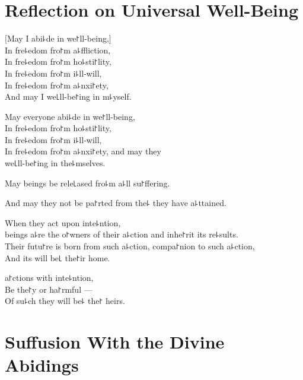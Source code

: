\chapter[Universal Well-Being]{Reflection on Universal Well-Being}


\begin{leader}
\end{leader}

[May I abi꜕de in we꜓ll-being,]\\
In fre꜕edom fro꜓m a꜕ffliction,\\
In fre꜕edom fro꜓m ho꜕sti꜓lity,\\
In fre꜕edom fro꜓m i꜕ll-will,\\
In fre꜕edom fro꜓m a꜕nxi꜓ety,\\
And may I  we꜖ll-be꜓ing in m꜕yself.

May everyone abi꜕de in we꜓ll-being,\\
In fre꜕edom fro꜓m ho꜕sti꜓lity,\\
In fre꜕edom fro꜓m i꜕ll-will,\\
In fre꜕edom fro꜓m a꜕nxi꜓ety, and may they\\
 we꜖ll-be꜓ing in the꜕mselves.

May  beings be rele꜖ased fro꜕m a꜕ll su꜓ffering.

And may they not be pa꜓rted from the꜕  they have a꜕ttained.

When they act upon inte꜕ntion,\\
 beings a꜕re the o꜓wners of their a꜕ction and inhe꜓rit its re꜕sults.\\
Their futu꜓re is born from such a꜕ction, compa꜓nion to such a꜕ction,\\
And its  will be꜖ the꜓ir home.

 a꜓ctions with inte꜕ntion,\\
Be the꜓y  or ha꜓rmful ---\\
Of su꜕ch  they will be꜕ the꜓ heirs.

\chapter*[Divine Abidings]{Suffusion With the Divine Abidings}


\delegateSetUseNext

